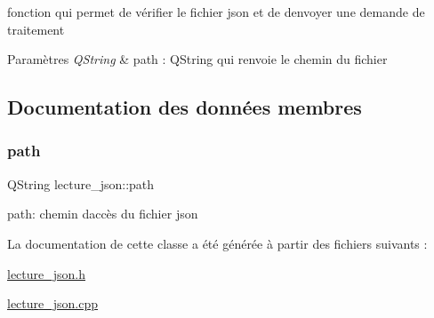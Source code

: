 fonction qui permet de vérifier le fichier json et de d\textquotesingle{}envoyer une demande de traitement 


\begin{DoxyParams}{Paramètres}
{\em Q\+String} & path \+: Q\+String qui renvoie le chemin du fichier \\
\hline
\end{DoxyParams}


\subsection{Documentation des données membres}
\mbox{\label{classlecture__json_addfbc41d56e266180e4a120ba3cd1c61}} 
\subsubsection{\texorpdfstring{path}{path}}
{\footnotesize\ttfamily Q\+String lecture\+\_\+json\+::path\hspace{0.3cm}{\ttfamily [private]}}

path\+: chemin d\textquotesingle{}accès du fichier json 

La documentation de cette classe a été générée à partir des fichiers suivants \+:\begin{DoxyCompactItemize}
\item 
\hyperlink{lecture__json_8h}{lecture\+\_\+json.\+h}\item 
\hyperlink{lecture__json_8cpp}{lecture\+\_\+json.\+cpp}\end{DoxyCompactItemize}
